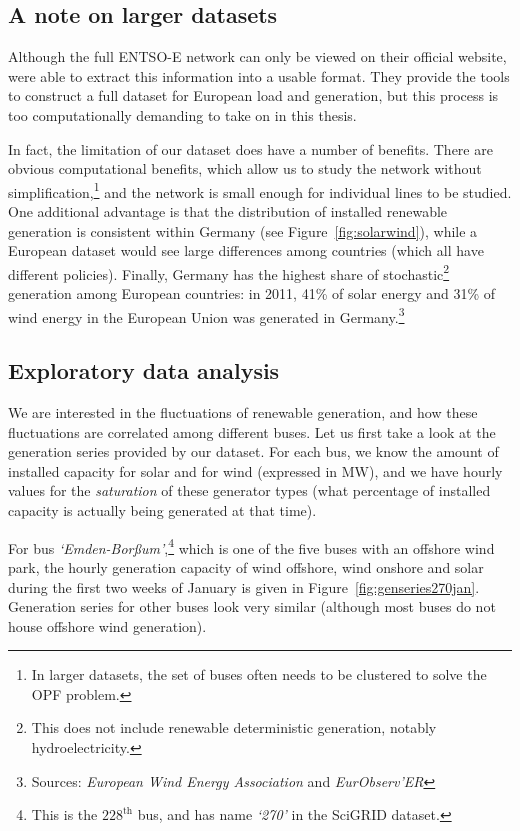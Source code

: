 \documentclass[main.tex]{subfiles}
\begin{document}
\subsection{A note on larger datasets}
Although the full ENTSO-E network can only be viewed on their official website, \cite{PyPSAEUR} were able to extract this information into a usable format. They provide the tools to construct a full dataset for European load and generation, but this process is too computationally demanding to take on in this thesis. 

In fact, the limitation of our dataset does have a number of benefits. There are obvious computational benefits, which allow us to study the network without simplification,\footnote{In larger datasets, the set of buses often needs to be clustered to solve the OPF problem.} and the network is small enough for individual lines to be studied. One additional advantage is that the distribution of installed renewable generation is consistent within Germany (see Figure~\ref{fig:solarwind}), while a European dataset would see large differences among countries (which all have different policies). Finally, Germany has the highest share of stochastic\footnote{This does not include renewable deterministic generation, notably hydroelectricity.} generation among European countries: in 2011, 41\% of solar energy and 31\% of wind energy in the European Union was generated in Germany.\footnote{Sources: \emph{European Wind Energy Association} and \emph{EurObserv’ER}}

\subsection{Exploratory data analysis}
We are interested in the fluctuations of renewable generation, and how these fluctuations are correlated among different buses. Let us first take a look at the generation series provided by our dataset. For each bus, we know the amount of installed capacity for solar and for wind (expressed in $\si{\mega\watt}$), and we have hourly values for the \emph{saturation} of these generator types (\ie what percentage of installed capacity is actually being generated at that time). 

For bus \emph{`Emden-Borßum'},\footnote{This is the $228^{\text{th}}$ bus, and has name \emph{`270'} in the SciGRID dataset.} which is one of the five buses with an offshore wind park, the hourly generation capacity of wind offshore, wind onshore and solar during the first two weeks of January is given in Figure~\ref{fig:genseries270jan}. Generation series for other buses look very similar (although most buses do not house offshore wind generation).
\end{document}
